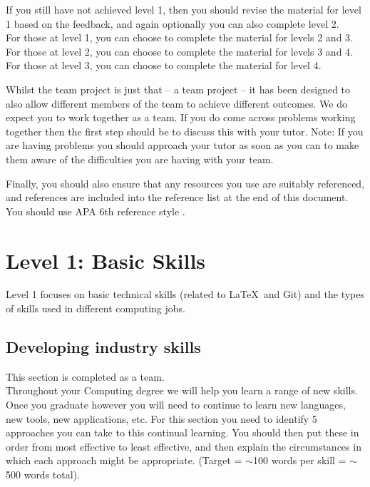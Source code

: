 \documentclass[a4paper, 11pt]{report}
\begin{document}
\begin{itemize}
    If you still have not achieved level 1, then you should revise the material for level 1 based on the feedback, and again optionally you can also complete level 2.\\
    For those at level 1, you can choose to complete the material for levels 2 and 3.\\
    For those at level 2, you can choose to complete the material for levels 3 and 4.\\
    For those at level 3, you can choose to complete the material for level 4.
\end{itemize}

Whilst the team project is just that -- a team project -- it has been designed to also allow different members of the team to achieve different outcomes. We do expect you to work together as a team. If you do come across problems working together then the first step should be to discuss this with your tutor. Note: If you are having problems you should approach your tutor as soon as you can to make them aware of the difficulties you are having with your team.

Finally, you should also ensure that any resources you use are suitably referenced, and references are included into the reference list at the end of this document. You should use APA 6th reference style \cite{apa6}.


\newpage
\section{Level 1: Basic Skills}

Level 1 focuses on basic technical skills (related to \LaTeX\ and Git) and the types of skills used in different computing jobs.

\subsection{Developing industry skills}

This section is completed as a team.\\
Throughout your Computing degree we will help you learn a range of new skills. Once you graduate however you will need to continue to learn new languages, new tools, new applications, etc. For this section you need to identify 5 approaches you can take to this continual learning. You should then put these in order from most effective to least effective, and then explain the circumstances in which each approach might be appropriate. (Target = $\sim$100 words per skill = $\sim$500 words total).
\end{document}
